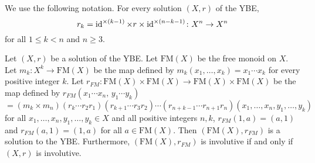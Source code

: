 We use the following notation. For every solution $(X,r)$ of the YBE,
\[r_k=\operatorname{id}^{\times (k-1)}\times r\times\operatorname{id}^{\times (n-k-1)}\colon X^{n}\rightarrow X^n\]
for all $1\leq k<n$ and $n\geq 3$.
\begin{theorem}
\label{thm:solfreemonoid}
Let $(X,r)$ be a solution of the YBE. Let $\mathrm{FM}(X)$ be the free monoid on $X$. Let $m_k\colon X^{k}\rightarrow \mathrm{FM}(X)$ be the map defined by $m_k(x_1,\dots ,x_k)=x_1\cdots x_k$ for every positive integer $k$. Let $r_{FM}\colon \mathrm{FM}(X)\times \mathrm{FM}(X)\rightarrow \mathrm{FM}(X)\times \mathrm{FM}(X)$ be the map defined by $r_{FM}(x_1\cdots x_n,\, y_1\cdots y_k)$
\[=(m_k\times m_n)(r_k\cdots r_2r_1)(r_{k+1}\cdots r_3r_2)\cdots(r_{n+k-1}\cdots r_{n+1}r_n)(x_1,\dots ,x_n,y_1,\dots ,y_k)\]
for all $x_1,\dots ,x_n,y_1,\dots ,y_k\in X$ and all positive integers $n,k$,   $r_{FM}(1,a)=(a,1)$ and $r_{FM}(a,1)=(1,a)$ for all $a\in \mathrm{FM}(X)$. Then $(\mathrm{FM}(X),r_{FM})$ is a solution to the YBE. Furthermore, $(\mathrm{FM}(X),r_{FM})$ is involutive if and only if $(X,r)$ is involutive.
\end{theorem}

